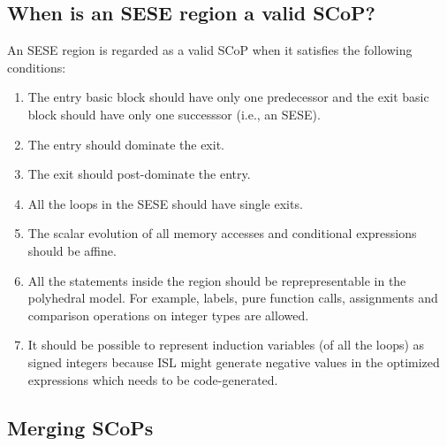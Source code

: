 \documentclass{sigplanconf}
\begin{document}
\subsection{When is an SESE region a valid SCoP?}
\label{subsec:validity}
An SESE region is regarded as a valid SCoP when it satisfies the following
conditions:
\begin{enumerate}
\item The entry basic block should have only one predecessor and the exit
  basic block should have only one successsor (i.e., an SESE).
\item The entry should dominate the exit.
\item The exit should post-dominate the entry.
\item All the loops in the SESE should have single exits.
\item The scalar evolution of all memory accesses and conditional expressions
  should be affine.
\item All the statements inside the region should be reprepresentable in the
  polyhedral model.  For example, labels, pure function calls, assignments and
  comparison operations on integer types are allowed.
\item It should be possible to represent induction variables (of all the loops)
  as signed integers because ISL might generate negative values in the optimized
  expressions which needs to be code-generated.
\end{enumerate}

\subsection{Merging SCoPs}
\label{subsec:merge-sese}
\end{document}
